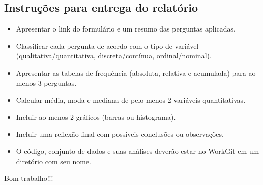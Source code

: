\documentclass[12pt,a4paper]{article}
\begin{document}
\subsection*{Instruções para entrega do relatório}

\begin{itemize}
    \item Apresentar o link do formulário e um resumo das perguntas aplicadas.
    \item Classificar cada pergunta de acordo com o tipo de variável (qualitativa/quantitativa, discreta/contínua, ordinal/nominal).
    \item Apresentar as tabelas de frequência (absoluta, relativa e acumulada) para ao menos 3 perguntas.
    \item Calcular média, moda e mediana de pelo menos 2 variáveis quantitativas.
    \item Incluir ao menos 2 gráficos (barras ou histograma).
    \item Incluir uma reflexão final com possíveis conclusões ou observações.
    \item O código, conjunto de dados e suas análises deverão estar no \href{https://github.com/claytontey/DS_Unesp/tree/main/Work_Git}{WorkGit} em um diretório com seu nome.
\end{itemize}


Bom trabalho!!!
\end{document}
